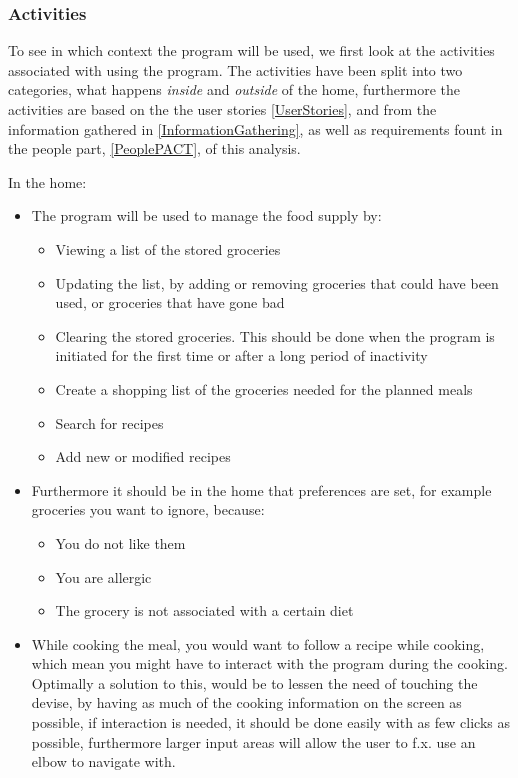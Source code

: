 \subsubsection{Activities}
To see in which context the program will be used, we first look at the activities associated with using the program. The activities have been split into two categories, what happens \textit{inside} and \textit{outside} of the home, furthermore the activities are based on the the user stories  \cref{UserStories}, and from the information gathered in \cref{InformationGathering}, as well as requirements fount in the people part, \cref{PeoplePACT}, of this analysis.

In the home:
\begin{itemize}
\item The program will be used to manage the food supply by:
	\begin{itemize}
		\item Viewing a list of the stored groceries
		\item Updating the list, by adding or removing groceries that could have been used, or groceries that have gone bad
		\item Clearing the stored groceries. This should be done when the program is initiated for the first time or after a long period of inactivity
		\item Create a shopping list of the groceries needed for the planned meals
		\item Search for recipes
		\item Add new or modified recipes
	\end{itemize}
	\item Furthermore it should be in the home that preferences are set, for example groceries you want to ignore, because:
	\begin{itemize}
		\item You do not like them
		\item You are allergic
		\item The grocery is not associated with a certain diet
	\end{itemize}
	\item While cooking the meal, you would want to follow a recipe while cooking, which mean you might have to interact with the program during the cooking. Optimally a solution to this, would be to lessen the need of touching the devise, by having as much of the cooking information on the screen as possible, if interaction is needed, it should be done easily with as few clicks as possible, furthermore larger input areas will allow the user to f.x. use an elbow to navigate with.
\end{itemize}

